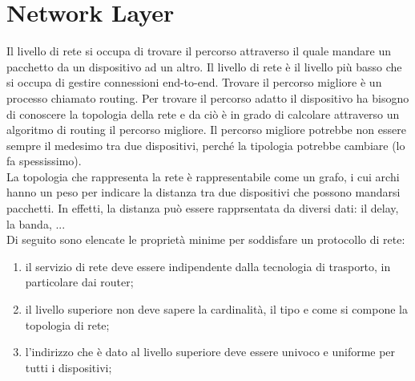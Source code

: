 \documentclass{article}
\begin{document}
\section{Network Layer}
Il livello di rete si occupa di trovare il percorso attraverso il quale mandare
un pacchetto da un dispositivo ad un altro. Il livello di rete è il livello più
basso che si occupa di gestire connessioni end-to-end. Trovare il percorso
migliore è un processo chiamato routing. Per trovare il percorso adatto il
dispositivo ha bisogno di conoscere la topologia della rete e da ciò è in grado
di calcolare attraverso un algoritmo di routing il percorso migliore. Il
percorso migliore potrebbe non essere sempre il medesimo tra due dispositivi,
perché la tipologia potrebbe cambiare (lo fa spessissimo).\\
La topologia che rappresenta la rete è rappresentabile come un grafo, i cui
archi hanno un peso per indicare la distanza tra due dispositivi che possono
mandarsi pacchetti. In effetti, la distanza può essere rapprsentata da diversi
dati: il delay, la banda, ...\\
Di seguito sono elencate le proprietà minime per soddisfare un protocollo di
rete:
\begin{enumerate}
	\item il servizio di rete deve essere indipendente dalla tecnologia di
		trasporto, in particolare dai router;

	\item il livello superiore non deve sapere la cardinalità, il tipo e come si
		compone la topologia di rete;

	\item l'indirizzo che è dato al livello superiore deve essere univoco e
		uniforme per tutti i dispositivi;
\end{enumerate}
\end{document}

